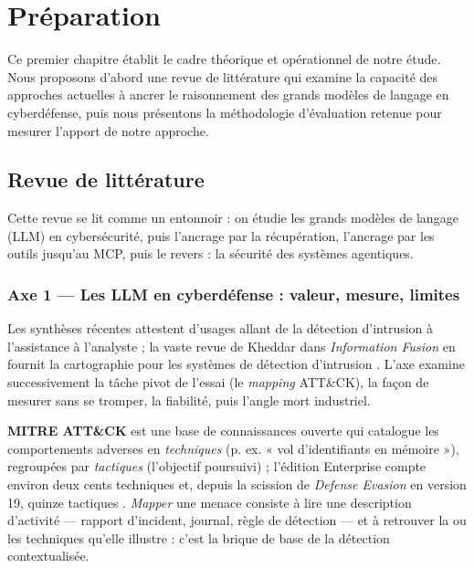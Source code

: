 \chapter{Préparation}\label{chap:preparation}
\label{chap:preparation}

Ce premier chapitre établit le cadre théorique et opérationnel de notre étude. Nous proposons d'abord une revue de littérature qui examine la capacité des approches actuelles à ancrer le raisonnement des grands modèles de langage en cyberdéfense, puis nous présentons la méthodologie d'évaluation retenue pour mesurer l'apport de notre approche.

\section{Revue de littérature}\label{sec:revue}
Cette revue se lit comme un entonnoir : on étudie les grands modèles de langage (LLM) en cybersécurité, puis l'ancrage par la récupération, l'ancrage par les outils jusqu'au MCP, puis le revers : la sécurité des systèmes agentiques.

\FloatBarrier
\subsection{Axe 1 --- Les LLM en cyberdéfense : valeur, mesure, limites}\label{sec:axe1}

Les synthèses récentes attestent d'usages allant de la détection d'intrusion à l'assistance à l'analyste ; la vaste revue de Kheddar dans \emph{Information Fusion} en fournit la cartographie pour les systèmes de détection d'intrusion \cite{kheddar}. L'axe examine successivement la tâche pivot de l'essai (le \emph{mapping} ATT\&CK), la façon de mesurer sans se tromper, la fiabilité, puis l'angle mort industriel.


\textbf{MITRE ATT\&CK} est une base de connaissances ouverte qui catalogue les comportements adverses en \emph{techniques} (p. ex. « vol d'identifiants en mémoire »), regroupées par \emph{tactiques} (l'objectif poursuivi) ; l'édition Enterprise compte environ deux cents techniques et, depuis la scission de \emph{Defense Evasion} en version 19, quinze tactiques \cite{attack}. \emph{Mapper} une menace consiste à lire une description d'activité --- rapport d'incident, journal, règle de détection --- et à retrouver la ou les techniques qu'elle illustre : c'est la brique de base de la détection contextualisée.

